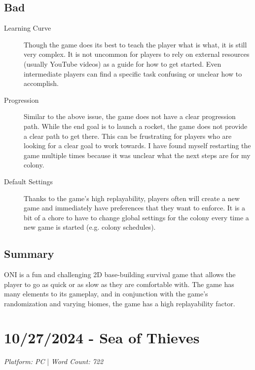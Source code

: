 \documentclass{article}
\begin{document}
\subsection{Bad}
\begin{description}
      \item[Learning Curve] Though the game does its best to teach the player
            what is what, it is still very complex. It is not uncommon for players to
            rely on external resources (usually YouTube videos) as a guide for how to
            get started. Even intermediate players can find a specific task confusing
            or unclear how to accomplish.
      \item[Progression] Similar to the above issue, the game does not have a
            clear progression path. While the end goal is to launch a rocket, the
            game does not provide a clear path to get there. This can be frustrating
            for players who are looking for a clear goal to work towards. I have
            found myself restarting the game multiple times because it was
            unclear what the next steps are for my colony.
      \item[Default Settings] Thanks to the game's high replayability, players
            often will create a new game and immediately have preferences that they
            want to enforce. It is a bit of a chore to have to change global settings
            for the colony every time a new game is started (e.g. colony schedules).
\end{description}

\subsection{Summary}
ONI is a fun and challenging 2D base-building survival game that allows the
player to go as quick or as slow as they are comfortable with. The game has many
elements to its gameplay, and in conjunction with the game's randomization and
varying biomes, the game has a high replayability factor.

\pagebreak

\section{10/27/2024 - Sea of Thieves}

\begin{center}
      \textit{Platform: PC} | \textit{Word Count: 722}
\end{center}
\end{document}
